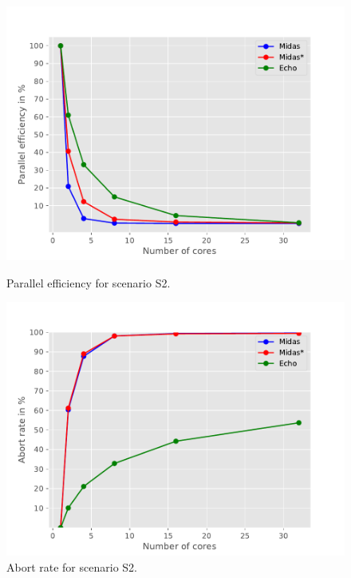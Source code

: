 \begin{figure}[h!]
\begin{minipage}[l]{0.50\textwidth}
    \includegraphics[width=\textwidth]{figures/bench/eff-sl}
    \caption{Parallel efficiency for scenario S2.}
    \label{fig:eff-s2}
\end{minipage}
\begin{minipage}[l]{0.50\textwidth}
    \includegraphics[width=\textwidth]{figures/bench/ar-sl}
    \caption{Abort rate for scenario S2.}
    \label{fig:ar-s2}
\end{minipage}
\end{figure}


